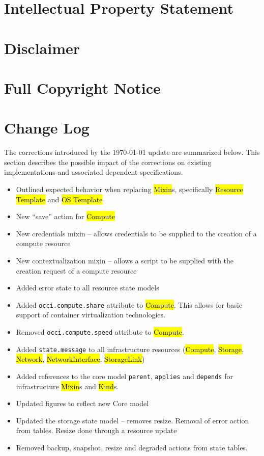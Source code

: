 \documentclass[10pt,a4paper]{article}
\begin{document}
\section{Intellectual Property Statement}


\section{Disclaimer}


\section{Full Copyright Notice}





\appendix

\newpage
\section{Change Log}
\label{sec:change_log}

The corrections introduced by the {\today} update are summarized below.
This section describes the possible impact of the corrections on existing
implementations and associated dependent specifications.

\begin{itemize}
\item Outlined expected behavior when replacing \hl{Mixin}s, specifically \hl{Resource Template}
      and \hl{OS Template}
\item New ``save'' action for \hl{Compute}
\item New credentials mixin -- allows credentials to be supplied to the creation of a compute resource
\item New contextualization mixin -- allows a script to be supplied with the creation request of a compute resource
\item Added error state to all resource state models
\item Added \texttt{occi.compute.share} attribute to \hl{Compute}. This allows for basic support of container virtualization technologies.
\item Removed \texttt{occi.compute.speed} attribute to \hl{Compute}.
\item Added \texttt{state.message} to all infrastructure resources (\hl{Compute}, \hl{Storage}, \hl{Network}, \hl{NetworkInterface}, \hl{StorageLink})
\item Added references to the core model \texttt{parent}, \texttt{applies} and \texttt{depends} for infrastructure \hl{Mixin}s and \hl{Kind}s.
\item Updated figures to reflect new Core model
\item Updated the storage state model -- removes resize. Removal of error action from tables. Resize done through a resource update
\item Removed backup, snapshot, resize and degraded actions from state tables.
\end{itemize}
\end{document}
